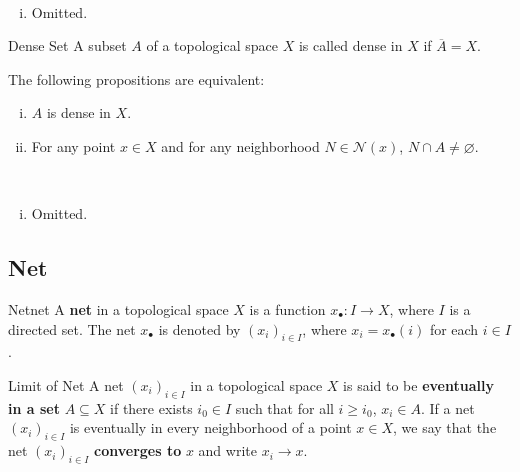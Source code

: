 \documentclass{report}
\begin{document}
\begin{prf}~\\ \vspace{-1em}
	\begin{enumerate}[(i)]
		\item Omitted.
	\end{enumerate}
\end{prf}


\begin{definition}{Dense Set}{}
	A subset $A$ of a topological space $X$ is called dense in $X$ if  $\overline{A}=X$.
\end{definition}

\begin{proposition}{}{}
	The following propositions are equivalent:
	\begin{enumerate}[(i)]
		\item $A$ is dense in $X$.
		\item For any point $x \in X$ and for any neighborhood $N\in\mathcal{N}(x)$, $N\cap A\ne \varnothing$.
	\end{enumerate}
\end{proposition}

\begin{prf}~\\ \vspace{-1em}
	\begin{enumerate}[(i)]
		\item Omitted.
	\end{enumerate}
\end{prf}
\subsection{Net}
\begin{definition}{Net}{net}
	A \textbf{net} in a topological space $X$ is a function $x_\bullet: I \to X$, where $I$ is a directed set. The net $x_\bullet$ is denoted by $\left(x_i\right)_{i \in I}$, where $x_i = x_\bullet(i)$ for each $i \in I$.
\end{definition}

\begin{definition}{Limit of Net}{}
	A net $\left(x_i\right)_{i \in I}$ in a topological space $X$ is said to be \textbf{eventually in a set} $A \subseteq X$ if there exists $i_0 \in I$ such that for all $i \geq i_0$, $x_i \in A$. If a net $\left(x_i\right)_{i \in I}$ is eventually in every neighborhood of a point $x \in X$, we say that the net $\left(x_i\right)_{i \in I}$ \textbf{converges to} $x$ and write $x_i \to x$.
\end{definition}
\end{document}
